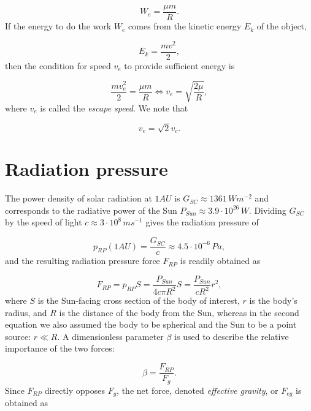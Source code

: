 \begin{equation}
    W_e =  \frac{\mu m}{R}.
\end{equation}
If the energy to do the work $W_e$ comes from the kinetic energy $E_k$ of the object,

\begin{equation}
    E_k = \frac{m v^2}{2},
\end{equation}
then the condition for speed $v_e$ to provide sufficient energy is

\begin{equation}
    \frac{m v_e^2}{2} = \frac{\mu m}{R} \Leftrightarrow v_e = \sqrt{\frac{2 \mu}{R}},
    \label{eq:escape_speed}
\end{equation}
where $v_e$ is called the \textit{escape speed}. We note that 

\begin{equation}
    v_e = \sqrt{2} v_c.
\end{equation}


\section{Radiation pressure}

The power density of solar radiation at $1 \si{AU}$ is $G_{SC} \approx 1361 \, \si{W m^{-2}}$ \citep{kopp2011new} and corresponds to the radiative power of the Sun $P_{Sun} \approx 3.9 \cdot 10^{26} \, \si{W}$. Dividing $G_{SC}$ by the speed of light $c \approx 3\cdot10^8 \, \si{m s^{-1}}$ gives the radiation pressure of

\begin{equation}
    p_{RP}(1 \si{AU}) = \frac{G_{SC}}{c} \approx 4.5 \cdot 10^{-6} \, \si{Pa},
\end{equation}
and the resulting radiation pressure force $F_{RP}$ is readily obtained as

\begin{equation}
    F_{RP} = p_{RP} S = \frac{P_{Sun}}{4 c \pi R^2} S = \frac{P_{Sun}}{cR^2} r^2, \label{eq:radiation_pressure_force}
\end{equation}
where $S$ is the Sun-facing cross section of the body of interest, $r$ is the body's radius, and $R$ is the distance of the body from the Sun, whereas in the second equation we also assumed the body to be spherical and the Sun to be a point source: $r \ll R$. A dimensionless parameter $\beta$ is used to describe the relative importance of the two forces:

\begin{equation}
    \beta = \frac{F_{RP}}{F_g}.
\end{equation}
Since $F_{RP}$ directly opposes $F_g$, the net force, denoted \textit{effective gravity}, or $F_{eg}$ is obtained as

